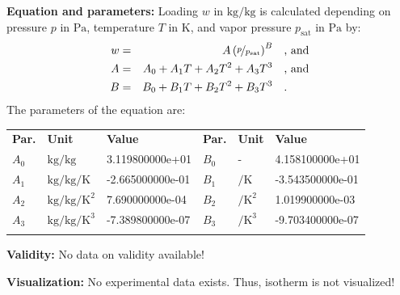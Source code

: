 \textbf{Equation and parameters:}
\newline
%
Loading $w$ in $\si{\kilogram\per\kilogram}$ is calculated depending on pressure $p$ in $\si{\pascal}$, temperature $T$ in $\si{\kelvin}$, and vapor pressure $p_\mathrm{sat}$ in $\si{\pascal}$ by:
%
\begin{equation*}
\begin{split}
w &=& A \left( \nicefrac{p}{p_\mathrm{sat}} \right) ^{B} & \quad\text{, and} \\
A &=& A_0 + A_1 T + A_2 T^2 + A_3 T^3 & \quad\text{, and} \\
B &=& B_0 + B_1 T + B_2 T^2 + B_3 T^3 & \quad\text{.} \\
\end{split}
\end{equation*}
%
The parameters of the equation are:
%
\begin{longtable}[l]{lll|lll}
\toprule
\addlinespace
\textbf{Par.} & \textbf{Unit} & \textbf{Value} &	\textbf{Par.} & \textbf{Unit} & \textbf{Value} \\
\addlinespace
\midrule
\endhead

\bottomrule
\endfoot
\bottomrule
\endlastfoot
\addlinespace

$A_0$ & $\si{\kilogram\per\kilogram}$ & 3.119800000e+01 & $B_0$ & - & 4.158100000e+01 \\
$A_1$ & $\si{\kilogram\per\kilogram\per\kelvin}$ & -2.665000000e-01 & $B_1$ & $\si{\per\kelvin}$ & -3.543500000e-01 \\
$A_2$ & $\si{\kilogram\per\kilogram\per\square\kelvin}$ & 7.690000000e-04 & $B_2$ & $\si{\per\square\kelvin}$ & 1.019900000e-03 \\
$A_3$ & $\si{\kilogram\per\kilogram\per\cubic\kelvin}$ & -7.389800000e-07 & $B_3$ & $\si{\per\cubic\kelvin}$ & -9.703400000e-07 \\

\addlinespace\end{longtable}

\textbf{Validity:}
\newline
No data on validity available!
\newline

\textbf{Visualization:}
%
\newline
No experimental data exists. Thus, isotherm is not visualized!
%

\FloatBarrier
\newpage
